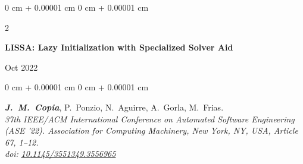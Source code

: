 \documentclass[10pt, letterpaper]{article}
\newenvironment{onecolentry}{
    \begin{adjustwidth}{
        0 cm + 0.00001 cm
    }{
        0 cm + 0.00001 cm
    }
}{
    \end{adjustwidth}
} %
\newenvironment{twocolentry}[2][]{
    \onecolentry
    \def\secondColumn{#2}
    \setcolumnwidth{\fill, 4.5 cm}
    \begin{paracol}{2}
}{
    \switchcolumn \raggedleft \secondColumn
    \end{paracol}
    \endonecolentry
} %
\begin{document}

        \vspace{0.2 cm}

        \begin{samepage}
            \begin{twocolentry}{
                Oct 2022
            }
                \textbf{LISSA: Lazy Initialization with Specialized Solver Aid}
            \end{twocolentry}

            \vspace{0.10 cm}
            \begin{onecolentry}
                \mbox{\textbf{\textit{J. M. Copia}}}, \mbox{P. Ponzio}, \mbox{N.
                Aguirre}, \mbox{A. Gorla}, \mbox{M. Frias}. \\
                \textit{37th IEEE/ACM International Conference on Automated Software
                Engineering (ASE '22). Association for Computing Machinery, New
                York, NY, USA, Article 67, 1–12.} \\ \textit{doi:}
                \href{https://doi.org/10.1145/3551349.3556965}{\textit{10.1145/3551349.3556965}}

            \end{onecolentry}

        \end{samepage}


        \vspace{0.2 cm}
\end{document}
